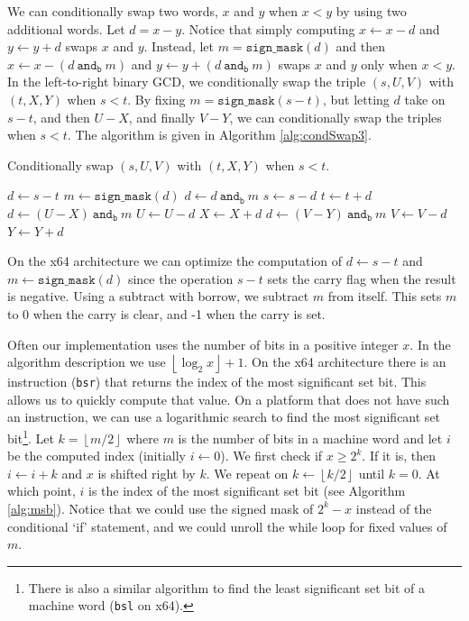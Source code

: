 \documentclass{ucalgthes1}
\theoremstyle{definition}
\newcommand{\floor}[1]{\left\lfloor #1 \right\rfloor}
\newcommand{\band}{~\texttt{and}_\texttt{b}~}
\begin{document}
We can conditionally swap two words, $x$ and $y$ when $x < y$ by using two additional words.  Let $d = x - y$.  Notice that simply computing $x \gets x - d$ and $y \gets y + d$ swaps $x$ and $y$.  Instead, let $m = \texttt{sign\_mask}(d)$ and then  $x \gets x - (d \band m)$ and $y \gets y + (d \band m)$ swaps $x$ and $y$ only when $x < y$.  In the left-to-right binary GCD, we conditionally swap the triple $(s, U, V)$ with $(t, X, Y)$ when $s < t$.  By fixing $m = \texttt{sign\_mask}(s - t)$, but letting $d$ take on $s - t$, and then $U - X$, and finally $V - Y$, we can conditionally swap the triples when $s < t$. The algorithm is given in Algorithm \ref{alg:condSwap3}.
\begin{algorithm}[h]
\caption{Conditionally swap $(s, U, V)$ with $(t, X, Y)$ when $s < t$.}
\label{alg:condSwap3}
\begin{algorithmic}[1]
\STATE $d \gets s - t$
\STATE $m \gets \texttt{sign\_mask}(d)$
\STATE $d \gets d \band m$
\STATE $s \gets s - d$
\STATE $t \gets t + d$
\STATE $d \gets (U - X) \band m$
\STATE $U \gets U - d$
\STATE $X \gets X + d$
\STATE $d \gets (V - Y) \band m$
\STATE $V \gets V - d$
\STATE $Y \gets Y + d$
\end{algorithmic}
\end{algorithm}
On the x64 architecture we can optimize the computation of $d \gets s - t$ and $m \gets \texttt{sign\_mask}(d)$ since the operation $s-t$ sets the carry flag when the result is negative.  Using a subtract with borrow, we subtract $m$ from itself.  This sets $m$ to 0 when the carry is clear, and -1 when the carry is set.

Often our implementation uses the number of bits in a positive integer $x$.  In the algorithm description we use $\floor{\log_2x} + 1$.  On the x64 architecture there is an instruction (\texttt{bsr}) that returns the index of the most significant set bit.  This allows us to quickly compute that value.  On a platform that does not have such an instruction, we can use a logarithmic search to find the most significant set bit\footnote{There is also a similar algorithm to find the least significant set bit of a machine word (\texttt{bsl} on x64).}.  Let $k = \floor{m/2}$ where $m$ is the number of bits in a machine word and let $i$ be the computed index (initially $i \gets 0$).  We first check if $x \ge 2^k$.  If it is, then $i \gets i + k$ and $x$ is shifted right by $k$.  We repeat on $k \gets \floor{k/2}$ until $k=0$.  At which point, $i$ is the index of the most significant set bit (see Algorithm \ref{alg:msb}).  Notice that we could use the signed mask of $2^k - x$ instead of the conditional `if' statement, and we could unroll the while loop for fixed values of $m$.
\end{document}
